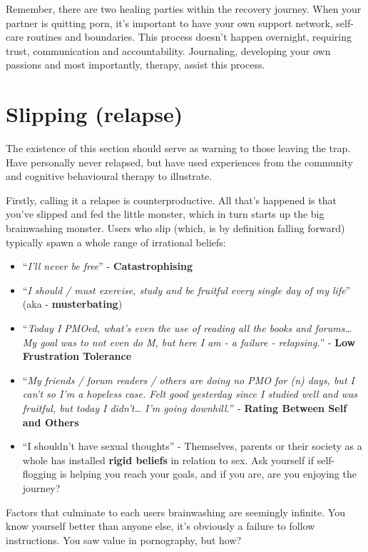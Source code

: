 \documentclass[
]{book}
\providecommand{\tightlist}{%
  \setlength{\itemsep}{0pt}\setlength{\parskip}{0pt}}
\begin{document}
Remember, there are two healing parties within the recovery journey. When your partner is quitting porn, it's important to have your own support network, self-care routines and boundaries. This process doesn't happen overnight, requiring trust, communication and accountability. Journaling, developing your own passions and most importantly, therapy, assist this process.

\hypertarget{slipping-relapse}{%
\section{Slipping (relapse)}\label{slipping-relapse}}

The existence of this section should serve as warning to those leaving the trap. Have personally never relapsed, but have used experiences from the community and cognitive behavioural therapy to illustrate.

Firstly, calling it a relapse is counterproductive. All that's happened is that you've slipped and fed the little monster, which in turn starts up the big brainwashing monster. Users who slip (which, is by definition falling forward) typically spawn a whole range of irrational beliefs:

\begin{itemize}
\tightlist
\item
  ``\emph{I'll never be free}'' - \textbf{Catastrophising}
\item
  ``\emph{I should / must exercise, study and be fruitful every single day of my life}'' (aka - \textbf{musterbating})
\item
  ``\emph{Today I PMOed, what's even the use of reading all the books and forums\ldots{} My goal was to not even do M, but here I am - a failure - relapsing.}'' - \textbf{Low Frustration Tolerance}
\item
  ``\emph{My friends / forum readers / others are doing no PMO for (n) days, but I can't so I'm a hopeless case. Felt good yesterday since I studied well and was fruitful, but today I didn't\ldots{} I'm going downhill.}'' - \textbf{Rating Between Self and Others}
\item
  ``I shouldn't have sexual thoughts'' - Themselves, parents or their society as a whole has installed \textbf{rigid beliefs} in relation to sex. Ask yourself if self-flogging is helping you reach your goals, and if you are, are you enjoying the journey?
\end{itemize}

Factors that culminate to each users brainwashing are seemingly infinite. You know yourself better than anyone else, it's obviously a failure to follow instructions. You saw value in pornography, but how?
\end{document}
